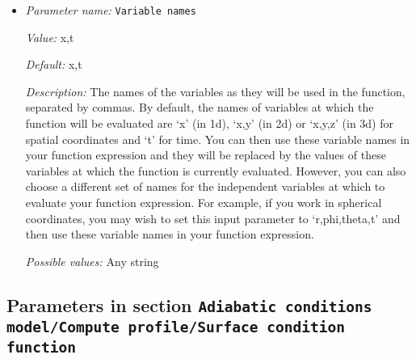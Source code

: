 \begin{itemize}
{\it Possible values:} A boolean value (true or false)
\item {\it Parameter name:} {\tt Variable names}
\label{parameters:Adiabatic conditions model/Compute profile/Variable names}
\label{parameters:Adiabatic_20conditions_20model/Compute_20profile/Variable_20names}


{\it Value:} x,t


{\it Default:} x,t


{\it Description:} The names of the variables as they will be used in the function, separated by commas. By default, the names of variables at which the function will be evaluated are `x' (in 1d), `x,y' (in 2d) or `x,y,z' (in 3d) for spatial coordinates and `t' for time. You can then use these variable names in your function expression and they will be replaced by the values of these variables at which the function is currently evaluated. However, you can also choose a different set of names for the independent variables at which to evaluate your function expression. For example, if you work in spherical coordinates, you may wish to set this input parameter to `r,phi,theta,t' and then use these variable names in your function expression.


{\it Possible values:} Any string
\end{itemize}



\subsection{Parameters in section \tt Adiabatic conditions model/Compute profile/Surface condition function}
\label{parameters:Adiabatic_20conditions_20model/Compute_20profile/Surface_20condition_20function}

